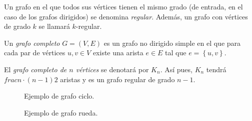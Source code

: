 \begin{definition}
Un grafo en el que todos sus vértices tienen el mismo grado (de entrada, en el caso de los grafos dirigidos) se denomina \emph{regular}. Además, un grafo con vértices de grado $k$ se llamará $k$-regular.
\end{definition}

\begin{definition}
Un \emph{grafo completo} $G=(V,E)$ es un grafo no dirigido simple en el que para cada par de vértices $u, v\in V$ existe una arista $e \in E$ tal que $e = \left\lbrace u,v\right\rbrace$.

El \emph{grafo completo de $n$ vértices} se denotará por $K_n$. Así pues, $K_n$ tendrá $frac{n\cdot (n-1)}{2}$ aristas y es un grafo regular de grado $n-1$.
\end{definition}

\begin{figure}[H]
  \centering
\begin{minipage}[t]{0.45\linewidth}
\centering
{}
\caption{Ejemplo de grafo ciclo.}
	\label{fig:grafo6}
\end{minipage}
\hspace{0.5cm}
\begin{minipage}[t]{0.45\linewidth}
\centering
\caption{Ejemplo de grafo rueda.}
\label{fig:grafo7}
\end{minipage}
\end{figure}

